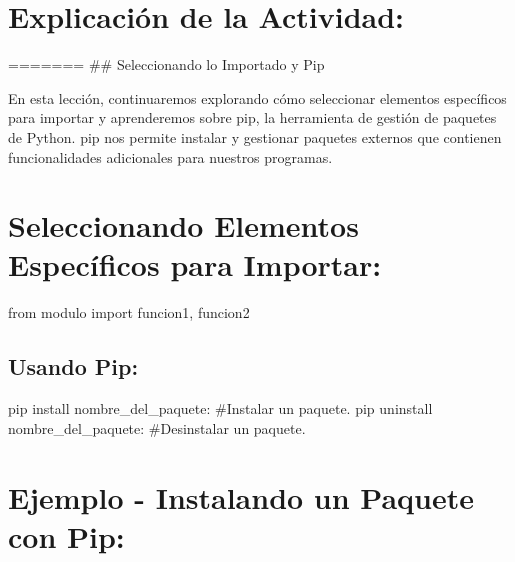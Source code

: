 \documentclass[
  a4paper,
  DIV=11,
  numbers=noendperiod,
  onepage,
  openany]{scrreprt}
\newenvironment{Shaded}{\begin{snugshade}}{\end{snugshade}}
\newcommand{\CommentTok}[1]{\textcolor[rgb]{0.37,0.37,0.37}{#1}}
\newcommand{\ExtensionTok}[1]{\textcolor[rgb]{0.00,0.23,0.31}{#1}}
\newcommand{\ImportTok}[1]{\textcolor[rgb]{0.00,0.46,0.62}{#1}}
\newcommand{\NormalTok}[1]{\textcolor[rgb]{0.00,0.23,0.31}{#1}}
\begin{document}
\hypertarget{explicaciuxf3n-de-la-actividad-62}{%
\section{Explicación de la
Actividad:}\label{explicaciuxf3n-de-la-actividad-62}}

======= \#\# Seleccionando lo Importado y Pip

En esta lección, continuaremos explorando cómo seleccionar elementos
específicos para importar y aprenderemos sobre pip, la herramienta de
gestión de paquetes de Python. pip nos permite instalar y gestionar
paquetes externos que contienen funcionalidades adicionales para
nuestros programas.

\hypertarget{seleccionando-elementos-especuxedficos-para-importar-3}{%
\section{Seleccionando Elementos Específicos para
Importar:}\label{seleccionando-elementos-especuxedficos-para-importar-3}}

\begin{Shaded}
\begin{Highlighting}[]
\ImportTok{from}\NormalTok{ modulo }\ImportTok{import}\NormalTok{ funcion1, funcion2}
\end{Highlighting}
\end{Shaded}

\hypertarget{usando-pip-1}{%
\subsection{Usando Pip:}\label{usando-pip-1}}

\begin{Shaded}
\begin{Highlighting}[]
\ExtensionTok{pip}\NormalTok{ install nombre\_del\_paquete: }\CommentTok{\#Instalar un paquete.}
\ExtensionTok{pip}\NormalTok{ uninstall nombre\_del\_paquete: }\CommentTok{\#Desinstalar un paquete.}
\end{Highlighting}
\end{Shaded}

\hypertarget{ejemplo---instalando-un-paquete-con-pip-1}{%
\section{Ejemplo - Instalando un Paquete con
Pip:}\label{ejemplo---instalando-un-paquete-con-pip-1}}
\end{document}
